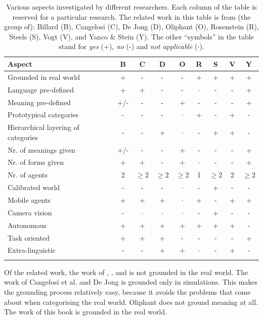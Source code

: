 \begin{table}[t]
\begin{tabular}{>{\raggedright}p{4cm}cccccccc}
\lsptoprule
Aspect & B & C & D & O & R & S & V & Y\\\midrule
Grounded in real world & + & - & - & - & + & + & + & +\\\hline
Language pre-defined & + & + & - & - & $\cdot$ & - & - & +\\\hline
Meaning pre-defined & +/- & - & - & + & - & - & - & +\\\hline
Prototypical categories & - & - & - & $\cdot$ & + & - & + & -\\\hline
Hierarchical layering of categories & - & - & + & $\cdot$ & - & + & + & -\\\hline
Nr. of meanings given & +/- & - & - & + & - & - & - & +\\\hline
Nr. of forms given & + & + & - & + & $\cdot$ & - & - & +\\\hline
Nr. of agents & 2 & $\geq 2$ & $\geq 2$ & $\geq 2$ & 1 & $\geq 2$ & 2 & $\geq 2$\\\hline
Calibrated world & - & - & - & $\cdot$ & - & + & - & -\\\hline
Mobile agents & + & + & + & $\cdot$ & + & - & + & +\\\hline
Camera vision & - & $\cdot$ & $\cdot$ & $\cdot$ & - & + & - & -\\\hline
Autonomous & + & + & + & + & + & + & + & -\\\hline
Task oriented & + & + & + & - & - & - & - & +\\\hline
Extra-linguistic & - & - & + & + & $\cdot$ & - & + & -\\
\lspbottomrule
\end{tabular}
\caption{Various aspects investigated by different researchers. Each column of the table is reserved for a particular research. The related work in this table is from (the group of): Billard (B), Cangelosi (C), De Jong (D), Oliphant (O), Rosenstein (R), Steels (S), Vogt (V), and Yanco \& Stein (Y). The other ``symbols'' in the table stand for {\it yes} (+), {\it no} (-) and {\it not applicable} ($\cdot$).}
\label{t:intro:contrib}
\end{table}


Of the related work, the work of \citet{cangelosiparisi:1998}, \citet{dejong:2000}, and \citet{oliphant:1997} is not grounded in the real world. The work of Cangelosi et al. and De Jong is grounded only in simulations. This makes the grounding process relatively easy, because it avoids the problems that come about when categorising the real world. Oliphant does not ground meaning at all. The work of this book is grounded in the real world.

